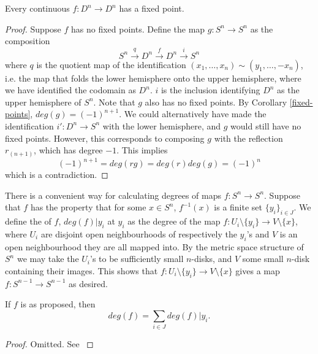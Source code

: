 \begin{theorem}
Every continuous $f:D^n\rightarrow D^n$ has a fixed point.
\end{theorem}
\begin{proof}
Suppose $f$ has no fixed points. Define the map $g:S^n\rightarrow S^n$ as the composition 
$$S^n\xrightarrow{q}D^n\xrightarrow{f}D^n\xrightarrow{i}S^n$$
where $q$ is the quotient map of the identification $(x_1,\dots,x_n)\sim (y_1,\dots,-x_n)$, i.e. the map that folds the lower hemisphere onto the upper hemisphere, where we have identified the codomain as $D^n$. $i$ is the inclusion identifying $D^n$ as the upper hemisphere of $S^n$. Note that $g$ also has no fixed points. By Corollary \ref{fixed-points}, $deg(g)=(-1)^{n+1}$. We could alternatively have made the identification $i':D^n\rightarrow S^n$ with the lower hemisphere, and $g$ would still have no fixed points. However, this corresponds to composing $g$ with the reflection $r_{(n+1)}$, which has degree $-1$. This implies
$$(-1)^{n+1}=deg(rg)=deg(r)deg(g)=(-1)^{n}$$
which is a contradiction.
\end{proof}


There is a convenient way for calculating degrees of maps $f:S^n\rightarrow S^n$. Suppose that $f$ has the property that for some $x\in S^n$, $f^{-1}(x)$ is a finite set $\{y_i\}_{i\in J}$. We define the  of $f$, $deg(f)|{y_i}$ at $y_i$ as the degree of the map $f:U_i\setminus \{y_i\}\rightarrow V\setminus\{x\}$, where $U_i$ are disjoint open neighbourhoods of respectively the $y_i$'s and $V$ is an open neighbourhood they are all mapped into. By the metric space structure of $S^n$ we may take the $U_i$'s to be sufficiently small $n$-disks, and $V$ some small $n$-disk containing their images. This shows that $f:U_i\setminus \{y_i\}\rightarrow V\setminus\{x\}$ gives a map $f:S^{n-1}\rightarrow S^{n-1}$ as desired.

\begin{proposition}\label{local-degree}
If $f$ is as proposed, then $$deg(f)=\sum_{i\in J}deg(f)|{y_i}.$$
\end{proposition}
\begin{proof}
Omitted. See \cite{Hatcher}
\end{proof}